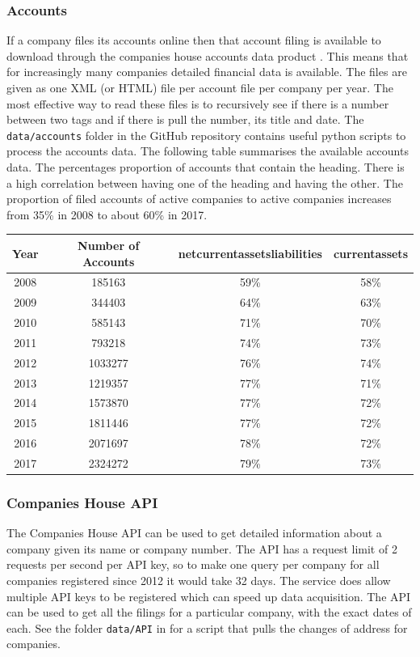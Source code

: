 \documentclass[a4paper,10pt]{article}
\begin{document}
   \subsubsection{Accounts}
   If a company files its accounts online then that account filing is available to download through the companies house accounts data product \cite{accountsdataproduct}. This means that for increasingly many companies detailed financial data is available.
   The files are given as one XML (or HTML) file per account file per company per year. The most effective way to read these files is to recursively see if there is a number between two tags and if there is pull the number, its title and date. The \texttt{data/accounts} folder in the GitHub repository \cite{github} contains useful python scripts to process the accounts data. The following table summarises the available accounts data. The percentages proportion of accounts that contain the heading. There is a high correlation between having one of the heading and having the other. The proportion of filed accounts of active companies to active companies increases from 35\% in 2008 to about 60\% in 2017.
   \begin{center}
      \begin{tabular}{  c | c | c | c  }
      Year & Number of Accounts & netcurrentassetsliabilities & currentassets \\
      \hline
      2008 & 185163  & 59\% & 58\% \\
      2009 & 344403  & 64\% & 63\% \\
      2010 & 585143  & 71\% & 70\% \\
      2011 & 793218  & 74\% & 73\% \\
      2012 & 1033277 & 76\% & 74\% \\
      2013 & 1219357 & 77\% & 71\% \\
      2014 & 1573870 & 77\% & 72\% \\
      2015 & 1811446 & 77\% & 72\% \\
      2016 & 2071697 & 78\% & 72\% \\
      2017 & 2324272 & 79\% & 73\% \\

      \end{tabular}
   \end{center}


   \subsubsection{Companies House API}
   The Companies House API \cite{companieshouseapi} can be used to get detailed information about a company given its name or company number. The API has a request limit of 2 requests per second per API key, so to make one query per company for all companies registered since 2012 it would take 32 days. The service does allow multiple API keys to be registered which can speed up data acquisition. The API can be used to get all the filings for a particular company, with the exact dates of each. See the folder \texttt{data/API} in \cite{github} for a script that pulls the changes of address for companies.
\end{document}
